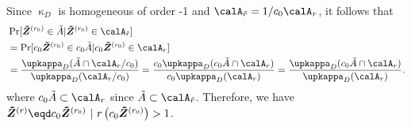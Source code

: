 \documentclass[12pt]{article}
\begin{document}
    Since $\upkappa_D$ is homogeneous of order -1 and $\calA_{\tilde r} =  1/c_0\calA_r$, it follows that
    \begin{align*}
        & \Pr[\bm{\tilde Z}^{(r_0)}\in \tilde A | \bm{\tilde Z}^{(r_0)} \in \calA_{\tilde r} ] \\
        &= \Pr[c_0\bm{\tilde Z}^{(r_0)}\in c_0\tilde A | c_0\bm{\tilde Z}^{(r_0)} \in \calA_{r} ] \\
        &= \frac{\upkappa_D(\tilde A \cap \calA_r/c_0)}{\upkappa_D(\calA_{r}/c_0)} = \frac{c_0\upkappa_D(c_0\tilde A \cap \calA_r)}{c_0\upkappa_D(\calA_{r})} = \frac{\upkappa_D(c_0\tilde A \cap \calA_r)}{\upkappa_D(\calA_{r})}. 
    \end{align*}
    where $c_0\tilde A\subset \calA_{r}$ since $\tilde A\subset \calA_{\tilde r}$. Therefore, we have $\bm{\tilde Z}^{(r)}\eqd c_0\bm{\tilde Z}^{(r_0)}\ | \ r\left(c_0\bm{\tilde Z}^{(r_0)}\right) > 1 $.





\end{document}
